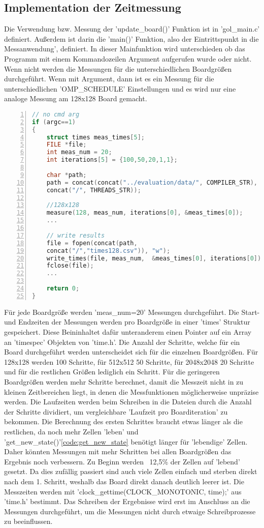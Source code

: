 \documentclass[plainarticle,zihtitle,german,final,hyperref,utf8]{zihpub}
\begin{document}
\subsection{Implementation der Zeitmessung}
Die Verwendung bzw. Messung der 'update\_board()' Funktion ist in 'gol\_main.c' definiert. Außerdem ist darin die 'main()' Funktion, also der Eintrittspunkt in die Messanwendung', definiert.
In dieser Mainfunktion wird unterschieden ob das Programm mit einem Kommandozeilen Argument aufgerufen wurde oder nicht. Wenn nicht werden die Messungen für die unterschiedlichen Boardgrößen durchgeführt. Wenn mit Argument, dann ist es ein Messung für die unterschiedlichen 'OMP\_SCHEDULE' Einstellungen und es wird nur eine analoge Messung am 128x128 Board gemacht.
\begin{lstlisting}[language=c, numbers=left]
// no cmd arg
if (argc==1)
{
	struct times meas_times[5];
	FILE *file;
	int meas_num = 20;
	int iterations[5] = {100,50,20,1,1};
	
	char *path;
	path = concat(concat("../evaluation/data/", COMPILER_STR),
	concat("/", THREADS_STR));

	//128x128
	measure(128, meas_num, iterations[0], &meas_times[0]);
	...	
	
	// write results
	file = fopen(concat(path,
	concat("/","times128.csv")), "w");
	write_times(file, meas_num,  &meas_times[0], iterations[0]);
	fclose(file);
	...
	
	return 0;
}
\end{lstlisting}
Für jede Boardgröße werden 'meas\_num=20' Messungen durchgeführt. Die Start- und Endzeiten der Messungen werden pro Boardgröße in einer 'times' Struktur gespeichert. Diese Beininhaltet dafür unteranderem einen Pointer auf ein Array an 'timespec' Objekten von 'time.h'. Die Anzahl der Schritte, welche für ein Board durchgeführt werden unterscheidet sich für die einzelnen Boardgrößen. Für 128x128 werden 100 Schritte, für 512x512 50 Schritte, für 2048x2048 20 Schritte und für die restlichen Größen lediglich ein Schritt. Für die geringeren Boardgrößen werden mehr Schritte berechnet, damit die Messzeit nicht in zu kleinen Zeitbereichen liegt, in denen die Messfunktionen möglicherweise unpräzise werden. Die Laufzeiten werden beim Schreiben in die Dateien durch die Anzahl der Schritte dividiert, um vergleichbare 'Laufzeit pro Boarditeration' zu bekommen.\newline
Die Berechnung des ersten Schrittes braucht etwas länger als die restlichen, da noch mehr Zellen 'leben' und 'get\_new\_state()'\ref{code:get_new_state} benötigt länger für 'lebendige' Zellen. Daher könnten Messungen mit mehr Schritten bei allen Boardgrößen das Ergebnis noch verbessern. Zu Beginn werden ~12,5\% der Zellen auf 'lebend' gesetzt. Da dies zufällig passiert sind auch viele Zellen einfach und sterben direkt nach dem 1. Schritt, weshalb das Board direkt danach deutlich leerer ist.\newline
Die Messzeiten werden mit 'clock\_gettime(CLOCK\_MONOTONIC, time);' aus 'time.h' bestimmt.\newline
Das Schreiben der Ergebnisse wird erst im Anschluss an die Messungen durchgeführt, um die Messungen nicht durch etwaige Schreibprozesse zu beeinflussen.
\end{document}
